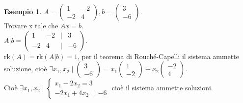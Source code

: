 \documentclass[a4paper]{article}
\theoremstyle{definition}
\newtheorem*{es}{Esempio}
\begin{document}
	\begin{es}
		$A = \begin{pmatrix}
			1 & -2 \\
			-2 & 4
		\end{pmatrix}, b = \begin{pmatrix}
			3 \\
			-6
		\end{pmatrix}$. \\
		Trovare x tale che $Ax = b$. \\
		$A|b = \begin{pmatrix}
			1 & -2 & \mid & 3 \\
			-2 & 4 & \mid & -6
		\end{pmatrix}$. \\
		$\text{rk}(A) = \text{rk}(A|b) = 1$, per il teorema di Rouché-Capelli il sistema ammette soluzione, cioè $\exists x_1, x_2 \mid \begin{pmatrix}
			3 \\
			-6
		\end{pmatrix} = x_1 \begin{pmatrix}
			1 \\
			-2
		\end{pmatrix} + x_2 \begin{pmatrix}
			-2 \\
			4
		\end{pmatrix}$. \\
		Cioè $\exists x_1, x_2 \mid \begin{cases}
			x_1 - 2x_2 = 3 \\
			-2x_1 + 4x_2 = -6
		\end{cases}$ cioè il sistema ammette soluzioni.
	\end{es}
\end{document}
